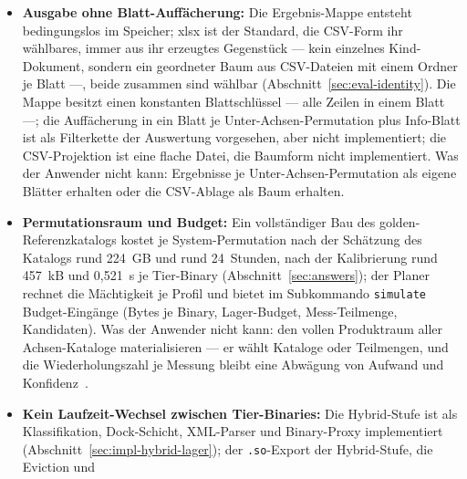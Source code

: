 \begin{nurlang}
\begin{itemize}
  Funktionen vor: der Erhebung (die ISA-Komplex-Achse mit SPD-/XMP-Deklaration der Speichertaktung und
  die Planer-Probe, die je Lauf den Host nach seinen Zählern fragt), der Übersetzungszeit-Factory (die
  Tier-Stempel aus den Ist-Eigenschaften) und dem Laufzeit-Verdikt; die Maschinen-Deklarationen der
  System-Registry sind Deklarationen mit konservierter Quelle (\texttt{dmidecode}). Nicht vorhanden
  sind die Anbindung an Runner und Prüf-Dock, der additive Ergebnis-Rückschrieb, der
  Provenienz-Roundtrip der Deklarationen und der Passungs-Stempel. Was der Anwender nicht kann: die
  Passung zwischen Maschine und Binary automatisch prüfen lassen (Abschnitte~\ref{sec:hw-probe}
  und~\ref{sec:impl-system-axes}).
  \item \textbf{Ausgabe ohne Blatt-Auffächerung:} Die Ergebnis-Mappe entsteht bedingungslos im
  Speicher; xlsx ist der Standard, die CSV-Form ihr wählbares, immer aus ihr erzeugtes Gegenstück --- kein
  einzelnes Kind-Dokument, sondern ein geordneter Baum aus CSV-Dateien mit einem Ordner je Blatt ---, beide
  zusammen sind wählbar
  (Abschnitt~\ref{sec:eval-identity}). Die Mappe besitzt einen konstanten Blattschlüssel --- alle Zeilen
  in einem Blatt ---; die Auffächerung in ein Blatt je Unter-Achsen-Permutation plus Info-Blatt ist als
  Filterkette der Auswertung vorgesehen, aber nicht implementiert; die CSV-Projektion ist eine flache Datei,
  die Baumform nicht implementiert. Was der Anwender nicht kann: Ergebnisse je
  Unter-Achsen-Permutation als eigene Blätter erhalten oder die CSV-Ablage als Baum erhalten.
  \item \textbf{Permutationsraum und Budget:} Ein vollständiger Bau des golden-Referenzkatalogs kostet je
  System-Permutation nach der Schätzung des Katalogs rund 224~GB und rund 24~Stunden, nach der
  Kalibrierung rund 457~kB und 0,521~s je Tier-Binary (Abschnitt~\ref{sec:answers}); der Planer rechnet
  die Mächtigkeit je Profil und bietet im Subkommando \texttt{simulate} Budget-Eingänge (Bytes je
  Binary, Lager-Budget, Mess-Teilmenge, Kandidaten). Was der Anwender nicht kann: den vollen Produktraum
  aller Achsen-Kataloge materialisieren --- er wählt Kataloge oder Teilmengen, und die Wiederholungszahl
  je Messung bleibt eine Abwägung von Aufwand und Konfidenz~\cite{kalibera2013rigorous}.
  \item \textbf{Kein Laufzeit-Wechsel zwischen Tier-Binaries:} Die Hybrid-Stufe ist als
  Klassifikation, Dock-Schicht, XML-Parser und Binary-Proxy implementiert
  (Abschnitt~\ref{sec:impl-hybrid-lager}); der \texttt{.so}-Export der Hybrid-Stufe, die Eviction und

\end{itemize}
\end{nurlang}
